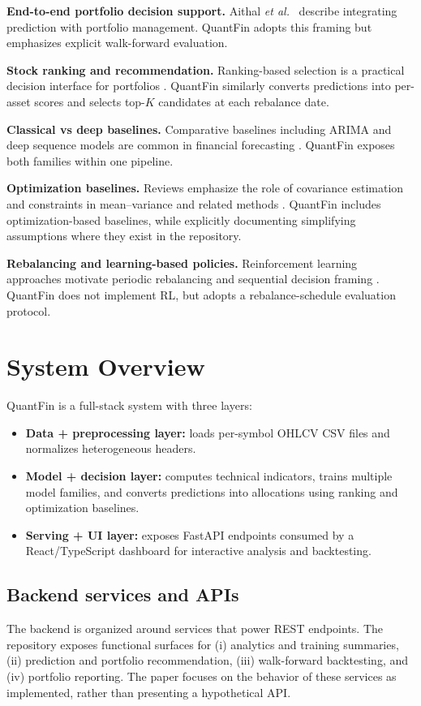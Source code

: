 \documentclass{svproc}
\begin{document}
\textbf{End-to-end portfolio decision support.} Aithal \emph{et al.}\ \citep{aithal2023realtime} describe integrating prediction with portfolio management. QuantFin adopts this framing but emphasizes explicit walk-forward evaluation.

\textbf{Stock ranking and recommendation.} Ranking-based selection is a practical decision interface for portfolios \citep{saha2021stockranking}. QuantFin similarly converts predictions into per-asset scores and selects top-$K$ candidates at each rebalance date.

\textbf{Classical vs deep baselines.} Comparative baselines including ARIMA and deep sequence models are common in financial forecasting \citep{gao2021arimadeep, karlis2021lstmfusion}. QuantFin exposes both families within one pipeline.

\textbf{Optimization baselines.} Reviews emphasize the role of covariance estimation and constraints in mean--variance and related methods \citep{gunjan2022portfolioreview}. QuantFin includes optimization-based baselines, while explicitly documenting simplifying assumptions where they exist in the repository.

\textbf{Rebalancing and learning-based policies.} Reinforcement learning approaches motivate periodic rebalancing and sequential decision framing \citep{lim2022dynamicrebalancing, ma2023tcr}. QuantFin does not implement RL, but adopts a rebalance-schedule evaluation protocol.

\section{System Overview}\label{sec:system}
QuantFin is a full-stack system with three layers:
\begin{itemize}
\item \textbf{Data + preprocessing layer:} loads per-symbol OHLCV CSV files and normalizes heterogeneous headers.
\item \textbf{Model + decision layer:} computes technical indicators, trains multiple model families, and converts predictions into allocations using ranking and optimization baselines.
\item \textbf{Serving + UI layer:} exposes FastAPI endpoints consumed by a React/TypeScript dashboard for interactive analysis and backtesting.
\end{itemize}

\subsection{Backend services and APIs}\label{sec:api}
The backend is organized around services that power REST endpoints. The repository exposes functional surfaces for (i) analytics and training summaries, (ii) prediction and portfolio recommendation, (iii) walk-forward backtesting, and (iv) portfolio reporting. The paper focuses on the behavior of these services as implemented, rather than presenting a hypothetical API.
\end{document}
